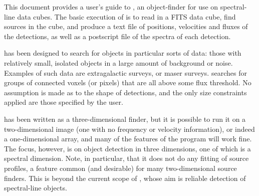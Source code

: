 %
%
%
%


This document provides a user's guide to \duchamp, an object-finder
for use on spectral-line data cubes. The basic execution of \duchamp
is to read in a FITS data cube, find sources in the cube, and produce
a text file of positions, velocities and fluxes of the detections, as
well as a postscript file of the spectra of each detection.

\duchamp has been designed to search for objects in particular sorts
of data: those with relatively small, isolated objects in a large
amount of background or noise. Examples of such data are extragalactic
\hi surveys, or maser surveys. \duchamp searches for groups of
connected voxels (or pixels) that are all above some flux
threshold. No assumption is made as to the shape of detections, and
the only size constraints applied are those specified by the user.

\duchamp has been written as a three-dimensional finder, but it is
possible to run it on a two-dimensional image (\ie one with no
frequency or velocity information), or indeed a one-dimensional array,
and many of the features of the program will work fine. The focus,
however, is on object detection in three dimensions, one of which is a
spectral dimension. Note, in particular, that it does not do any
fitting of source profiles, a feature common (and desirable) for many
two-dimensional source finders. This is beyond the current scope of
\duchamp, whose aim is reliable detection of spectral-line objects.

